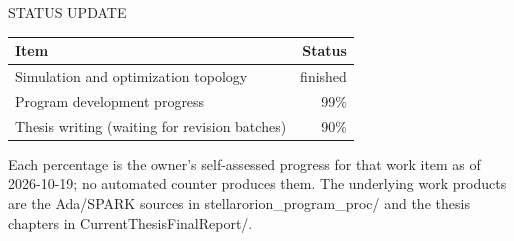 \documentclass[aspectratio=169,11pt]{beamer}
\begin{document}
\begin{frame}{STATUS UPDATE}
  \begin{tabular}{@{}p{7.2cm}r@{}}
    \textbf{Item} & \textbf{Status} \\
    \hline
    Simulation and optimization topology & finished \\
    Program development progress & 99\% \\
    Thesis writing (waiting for revision batches) & 90\% \\
  \end{tabular}
  \vspace{0.4cm}
  \par{\scriptsize Each percentage is the owner's self-assessed progress for
  that work item as of 2026-10-19; no automated counter produces them. The
  underlying work products are the Ada/SPARK sources in
  stellarorion\_program\_proc/ and the thesis chapters in
  CurrentThesisFinalReport/.}
\end{frame}
\end{document}
